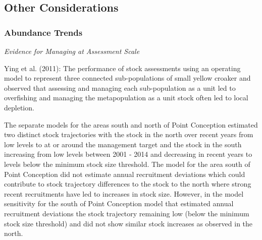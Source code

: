 \documentclass[11pt,
  english,
  a4paper,
]{article}
\begin{document}
\leavevmode\tagmcend\tagstructend\par


\hypertarget{other-considerations}{%
\subsection{Other Considerations}\label{other-considerations}}

\leavevmode\tagmcend\tagstructend


\hypertarget{abundance-trends}{%
\subsubsection{Abundance Trends}\label{abundance-trends}}

\leavevmode\tagmcend\tagstructend


\emph{Evidence for Managing at Assessment Scale}

\leavevmode\tagmcend\tagstructend\par


Ying et al. {(2011)\leavevmode\tagmcend\tagstructend}: The performance of stock assessments using an operating model to represent three connected sub-populations of small yellow croaker and observed that assessing and managing each sub-population as a unit led to overfishing and managing the metapopulation as a unit stock often led to local depletion.

\leavevmode\tagmcend\tagstructend\par


The separate models for the areas south and north of Point Conception estimated two distinct stock trajectories with the stock in the north over recent years from low levels to at or around the management target and the stock in the south increasing from low levels between 2001 - 2014 and decreasing in recent years to levels below the minimum stock size threshold. The model for the area south of Point Conception did not estimate annual recruitment deviations which could contribute to stock trajectory differences to the stock to the north where strong recent recruitments have led to increases in stock size. However, in the model sensitivity for the south of Point Conception model that estimated annual recruitment deviations the stock trajectory remaining low (below the minimum stock size threshold) and did not show similar stock increases as observed in the north.
\end{document}
